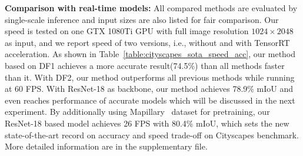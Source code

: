 \noindent
\textbf{Comparison with real-time models:} All compared methods are evaluated by single-scale inference and input sizes are also listed for fair comparison. Our speed is tested on one GTX 1080Ti GPU with full image resolution $1024 \times 2048$ as input, and we report speed of two versions, i.e., without and with TensorRT acceleration. As shown in Table~\ref{table:cityscapes_sota_speed_acc}, our method based on DF1 achieves a more accurate result(74.5\%) than all methods faster than it. With DF2, our method outperforms all previous methods while running at 60 FPS. With ResNet-18 as backbone, our method achieves 78.9\% mIoU and even reaches performance of accurate models which will be discussed in the next experiment. By additionally using Mapillary~\cite{mapillary} dataset for pretraining, our ResNet-18 based model achieves 26 FPS with 80.4\% mIoU, which sets the new state-of-the-art record on accuracy and speed trade-off on Cityscapes benchmark. More detailed information are in the supplementary file. 


